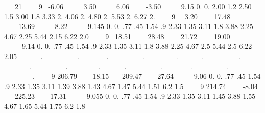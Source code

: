 \documentclass{article}
\begin{document}
\bigskip

\ \ \ 21 \ \ \ \ 9 \ {}-6.06 \ \ \ \ \ 3.50 \ \ \ \ \ 6.06 \ \ \ \ {}-3.50 \ \ \ \ \ 9.15 0. 0. 2.00 1.2 2.50 1.5 3.00 1.8 3.33 2. 4.06 2. 4.80 2. 5.53 2. 6.27 2. \ \ \ \ 9 \ \ 3.20 \ \ \ \ 17.48 \ \ \ \ 13.69 \ \ \ \ \ 8.22 \ \ \ \ \ 9.145 0. 0. .77 .45 1.54 .9 2.33 1.35 3.11 1.8 3.88 2.25 4.67 2.25 5.44 2.15 6.22 2.0 \ \ \ \ 9 \ 18.51 \ \ \ \ 28.48 \ \ \ \ 21.72 \ \ \ \ 19.00 \ \ \ \ \ 9.14 0. 0. .77 .45 1.54 .9 2.33 1.35 3.11 1.8 3.88 2.25 4.67 2.5 5.44 2.5 6.22 2.05 \ \ \ \ \ \ . \ \ \ \ \ \ \ \ \ . \ \ \ \ \ \ \ . \ \ \ \ \ \ \ \ \ . \ \ \ \ \ \ \ \ . \ \ \ \ \ \ . \ \ \ \ \ \ \ \ \ . \ \ \ \ \ \ \ . \ \ \ \ \ \ \ \ \ . \ \ \ \ \ \ \ \ . \ \ \ \ \ \ . \ \ \ \ \ \ \ \ \ . \ \ \ \ \ \ \ . \ \ \ \ \ \ \ \ \ . \ \ \ \ \ \ \ \ . \ \ \ \ 9 206.79 \ \ \ {}-18.15 \ \ \ 209.47 \ \ \ {}-27.64 \ \ \ \ \ 9.06 0. 0. .77 .45 1.54 .9 2.33 1.35 3.11 1.39 3.88 1.43 4.67 1.47 5.44 1.51 6.2 1.5 \ \ \ \ 9 214.74 \ \ \ \ {}-8.04 \ \ \ 225.23 \ \ \ {}-17.31 \ \ \ \ \ 9.055 0. 0. .77 .45 1.54 .9 2.33 1.35 3.11 1.45 3.88 1.55 
4.67 1.65 5.44 1.75 6.2 1.8
\end{document}
